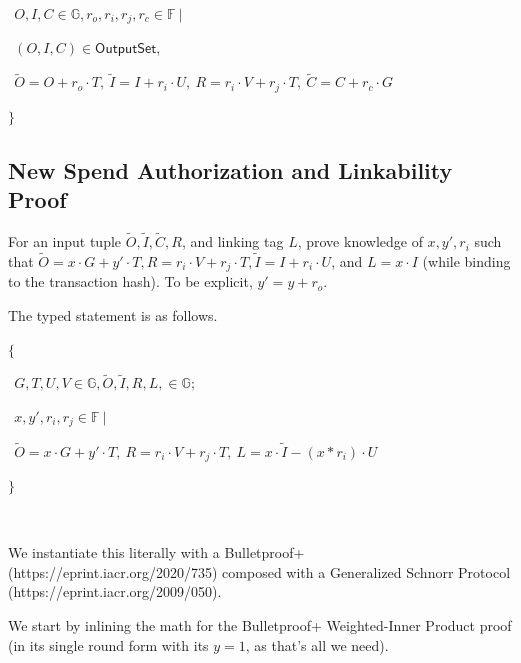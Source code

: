 \documentclass[]{article}
\begin{document}
$~~O, I, C \in \mathbb{G}, r_o, r_i, r_j, r_c \in \mathbb{F} ~|$

$~~(O, I, C) \in \mathsf{OutputSet},~$

$~~\tilde{O} = O + r_o \cdot T,~ \tilde{I} = I + r_i \cdot U,~ R = r_i \cdot V + r_j \cdot T,~ \tilde{C} = C + r_c \cdot G$

$\}$

\subsection{New Spend Authorization and Linkability Proof}

For an input tuple $\tilde{O}, \tilde{I}, \tilde{C}, R$, and linking tag $L$, prove knowledge of $x, y', r_i$ such that $\tilde{O} = x \cdot G + y' \cdot T, R = r_i \cdot V + r_j \cdot T, \tilde{I} = I + r_i \cdot U$, and $L = x \cdot I$ (while binding to the transaction hash). To be explicit, $y' = y + r_o$.

The typed statement is as follows.

$\{$

$~~G, T, U, V \in \mathbb{G}, \tilde{O}, \tilde{I}, R, L, \in \mathbb{G};$

$~~x, y', r_i, r_j \in \mathbb{F} ~|$

$~~\tilde{O} = x \cdot G + y' \cdot T,~ R = r_i \cdot V + r_j \cdot T,~ L = x \cdot \tilde{I} - (x * r_i) \cdot U$

$\}$

\

We instantiate this literally with a Bulletproof+ (https://eprint.iacr.org/2020/735) composed with a Generalized Schnorr Protocol (https://eprint.iacr.org/2009/050).

We start by inlining the math for the Bulletproof+ Weighted-Inner Product proof (in its single round form with its $y = 1$, as that's all we need).
\end{document}
